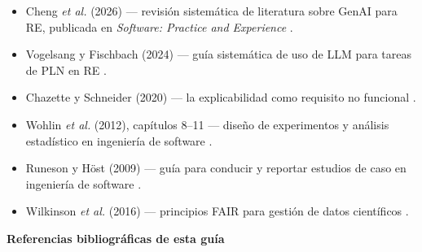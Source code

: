 \documentclass[11pt,a4paper]{article}
\newcounter{secc}
\newcommand{\secband}[1]{%
    \stepcounter{secc}\par\vspace{9pt}\noindent
    {\setlength{\fboxsep}{0pt}%
        \colorbox{uteqgold}{\parbox[c][20pt][c]{0.05\textwidth}{\centering\textbf{\color{white}\small \arabic{secc}}}}%
        \colorbox{uteqgreen}{\parbox[c][20pt][c]{0.95\textwidth}{\hspace{8pt}\textbf{\color{white}\small #1}}}%
    }\par\vspace{5pt}}
\begin{document}
\begin{itemize}
    \item Cheng \emph{et al.} (2026) --- revisión sistemática de literatura sobre GenAI para RE, publicada en \textit{Software: Practice and Experience} \cite{cheng2026genai}.
    \item Vogelsang y Fischbach (2024) --- guía sistemática de uso de LLM para tareas de PLN en RE \cite{vogelsang2024llm}.
    \item Chazette y Schneider (2020) --- la explicabilidad como requisito no funcional \cite{chazette2020nfr}.
    \item Wohlin \emph{et al.} (2012), capítulos 8--11 --- diseño de experimentos y análisis estadístico en ingeniería de software \cite{wohlin2012experimentation}.
    \item Runeson y Höst (2009) --- guía para conducir y reportar estudios de caso en ingeniería de software \cite{runeson2009guidelines}.
    \item Wilkinson \emph{et al.} (2016) --- principios FAIR para gestión de datos científicos \cite{wilkinson2016fair}.
\end{itemize}

\secband{Referencias bibliográficas de esta guía}



\end{document}
